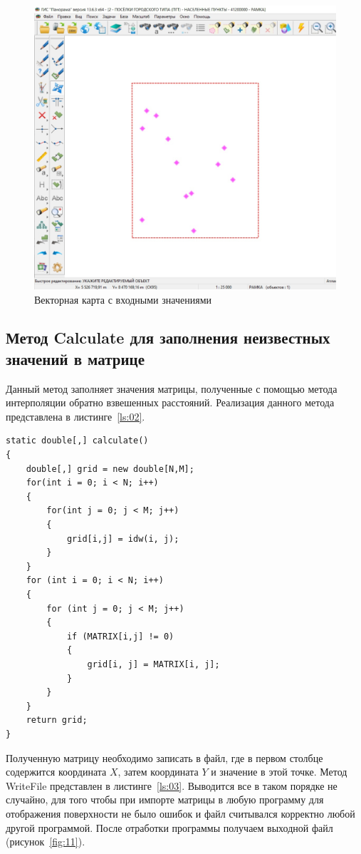 \begin{figure}[h!]
    \center
    \includegraphics[scale=0.3]{images/333.jpg}
    \caption{Векторная карта с входными значениями}
    \label{fig:10}
\end{figure}


\subsection{Метод Calculate для заполнения неизвестных значений в матрице}

Данный метод заполняет значения матрицы, полученные с помощью метода интерполяции обратно взвешенных расстояний. Реализация данного метода представлена в листинге~\ref{ls:02}.

\begin{lstlisting}[caption={Метод Calculate}, label={ls:02}]
static double[,] calculate()
{
    double[,] grid = new double[N,M];
    for(int i = 0; i < N; i++)
    {
        for(int j = 0; j < M; j++)
        {
            grid[i,j] = idw(i, j);
        }
    }
    for (int i = 0; i < N; i++)
    {
        for (int j = 0; j < M; j++)
        {
            if (MATRIX[i,j] != 0)
            {
                grid[i, j] = MATRIX[i, j];
            }
        }
    }
    return grid;
}
\end{lstlisting}

Полученную матрицу необходимо записать в файл, где в первом столбце содержится координата $X$, затем координата $Y$ и значение в этой точке. Метод WriteFile представлен в листинге~\ref{ls:03}. Выводится все в таком порядке не случайно, для того чтобы при импорте матрицы в любую программу для отображения поверхности не было ошибок и файл считывался корректно любой другой программой. После отработки программы получаем выходной файл (рисунок~\ref{fig:11}). 


